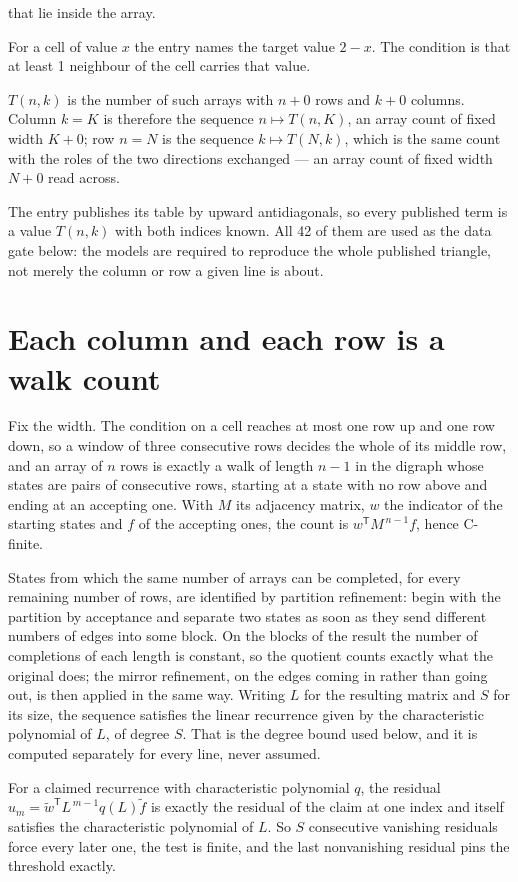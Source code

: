 \documentclass[11pt]{article}
\theoremstyle{definition}
\begin{document}
that lie inside the array.

For a cell of value $x$ the entry names the target value $2 - x$. The condition is that at least 1 neighbour of the cell carries that value.

$T(n,k)$ is the number of such arrays with $n + 0$ rows and $k + 0$ columns. Column $k = K$ is therefore the sequence $n \mapsto T(n,K)$, an array count of fixed width $K + 0$; row $n = N$ is the sequence $k \mapsto T(N,k)$, which is the same count with the roles of the two directions exchanged --- an array count of fixed width $N + 0$ read across.

The entry publishes its table by upward antidiagonals, so every published term is a value $T(n,k)$ with both indices known. All 42 of them are used as the data gate below: the models are required to reproduce the whole published triangle, not merely the column or row a given line is about.

\section{Each column and each row is a walk count}

Fix the width. The condition on a cell reaches at most one row up and one row down, so a window of three consecutive rows decides the whole of its middle row, and an array of $n$ rows is exactly a walk of length $n-1$ in the digraph whose states are pairs of consecutive rows, starting at a state with no row above and ending at an accepting one. With $M$ its adjacency matrix, $w$ the indicator of the starting states and $f$ of the accepting ones, the count is $w^{\mathsf T}M^{\,n-1}f$, hence C-finite.

States from which the same number of arrays can be completed, for every remaining number of rows, are identified by partition refinement: begin with the partition by acceptance and separate two states as soon as they send different numbers of edges into some block. On the blocks of the result the number of completions of each length is constant, so the quotient counts exactly what the original does; the mirror refinement, on the edges coming in rather than going out, is then applied in the same way. Writing $L$ for the resulting matrix and $S$ for its size, the sequence satisfies the linear recurrence given by the characteristic polynomial of $L$, of degree $S$. That is the degree bound used below, and it is computed separately for every line, never assumed.

For a claimed recurrence with characteristic polynomial $q$, the residual $u_m = \tilde w^{\mathsf T}L^{\,m-1}q(L)\tilde f$ is exactly the residual of the claim at one index and itself satisfies the characteristic polynomial of $L$. So $S$ consecutive vanishing residuals force every later one, the test is finite, and the last nonvanishing residual pins the threshold exactly.
\end{document}
